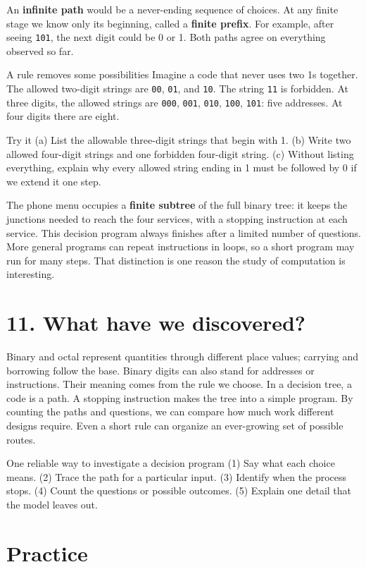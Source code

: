 \documentclass[10pt]{article}
\newcommand{\sect}[1]{\medskip\section*{\color{olive}#1}\vspace{-5pt}}
\begin{document}
An \textbf{infinite path} would be a never-ending sequence of choices. At any finite stage we know only its beginning, called a \textbf{finite prefix}. For example, after seeing \texttt{101}, the next digit could be 0 or 1. Both paths agree on everything observed so far.
\begin{worked}{A rule removes some possibilities}
Imagine a code that never uses two 1s together. The allowed two-digit strings are \texttt{00}, \texttt{01}, and \texttt{10}. The string \texttt{11} is forbidden. At three digits, the allowed strings are \texttt{000}, \texttt{001}, \texttt{010}, \texttt{100}, \texttt{101}: five addresses. At four digits there are eight.
\end{worked}
\begin{taskbox}{Try it}
(a) List the allowable three-digit strings that begin with 1. (b) Write two allowed four-digit strings and one forbidden four-digit string. (c) Without listing everything, explain why every allowed string ending in 1 must be followed by 0 if we extend it one step.
\end{taskbox}
The phone menu occupies a \textbf{finite subtree} of the full binary tree: it keeps the junctions needed to reach the four services, with a stopping instruction at each service. This decision program always finishes after a limited number of questions. More general programs can repeat instructions in loops, so a short program may run for many steps. That distinction is one reason the study of computation is interesting.
\sect{11. What have we discovered?}
Binary and octal represent quantities through different place values; carrying and borrowing follow the base. Binary digits can also stand for addresses or instructions. Their meaning comes from the rule we choose. In a decision tree, a code is a path. A stopping instruction makes the tree into a simple program. By counting the paths and questions, we can compare how much work different designs require. Even a short rule can organize an ever-growing set of possible routes.
\begin{worked}{One reliable way to investigate a decision program}
(1) Say what each choice means. (2) Trace the path for a particular input. (3) Identify when the process stops. (4) Count the questions or possible outcomes. (5) Explain one detail that the model leaves out.
\end{worked}
\sect{Practice}
\end{document}
